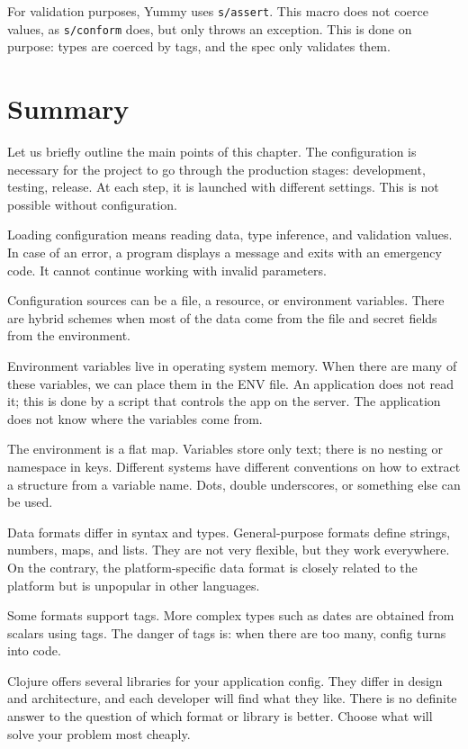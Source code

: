 For validation purposes, Yummy uses \verb|s/assert|. This macro does not coerce values, as \verb|s/conform| does, but only throws an exception. This is done on purpose: types are coerced by tags, and the spec only validates them.

\section{Summary}

Let us briefly outline the main points of this chapter. The configuration is necessary for the project to go through the production stages: development, testing, release. At each step, it is launched with different settings. This is not possible without configuration.

Loading configuration means reading data, type inference, and validation values. In case of an error, a program displays a message and exits with an emergency code. It cannot continue working with invalid parameters.

Configuration sources can be a file, a resource, or environment variables. There are hybrid schemes when most of the data come from the file and secret fields from the environment.

Environment variables live in operating system memory. When there are many of these variables, we can place them in the ENV file. An application does not read it; this is done by a script that controls the app on the server. The application does not know where the variables come from.

The environment is a flat map. Variables store only text; there is no nesting or namespace in keys. Different systems have different conventions on how to extract a structure from a variable name. Dots, double underscores, or something else can be used.

Data formats differ in syntax and types. General-purpose formats define strings, numbers, maps, and lists. They are not very flexible, but they work everywhere. On the contrary, the platform-specific data format is closely related to the platform but is unpopular in other languages.

Some formats support tags. More complex types such as dates are obtained from scalars using tags. The danger of tags is: when there are too many, config turns into code.

Clojure offers several libraries for your application config. They differ in design and architecture, and each developer will find what they like. There is no definite answer to the question of which format or library is better. Choose what will solve your problem most cheaply.
